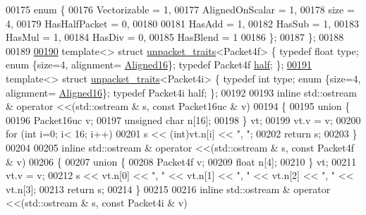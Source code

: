 \begin{DoxyCode}
{00175   \textcolor{keyword}{enum} \{
00176     Vectorizable = 1,
00177     AlignedOnScalar = 1,
00178     size = 4,
00179     HasHalfPacket = 0,
00180 
00181     HasAdd  = 1,
00182     HasSub  = 1,
00183     HasMul  = 1,
00184     HasDiv  = 0,
00185     HasBlend = 1
00186   \};
00187 \};
00188 
00189 
\hyperlink{struct_eigen_1_1internal_1_1unpacket__traits_3_01_packet4f_01_4}{00190} \textcolor{keyword}{template}<> \textcolor{keyword}{struct }\hyperlink{struct_eigen_1_1internal_1_1unpacket__traits}{unpacket\_traits}<Packet4f> \{ \textcolor{keyword}{typedef} \textcolor{keywordtype}{float}  type; \textcolor{keyword}{enum} \{size=4, alignment=
      \hyperlink{group__enums_gga45fe06e29902b7a2773de05ba27b47a1af8e2bf74b04c02199f62c5e3c06dbfcc}{Aligned16}\}; \textcolor{keyword}{typedef} Packet4f \hyperlink{struct_eigen_1_1internal_1_1_packet4f}{half}; \};
\hyperlink{struct_eigen_1_1internal_1_1unpacket__traits_3_01_packet4i_01_4}{00191} \textcolor{keyword}{template}<> \textcolor{keyword}{struct }\hyperlink{struct_eigen_1_1internal_1_1unpacket__traits}{unpacket\_traits}<Packet4i> \{ \textcolor{keyword}{typedef} \textcolor{keywordtype}{int}    type; \textcolor{keyword}{enum} \{size=4, alignment=
      \hyperlink{group__enums_gga45fe06e29902b7a2773de05ba27b47a1af8e2bf74b04c02199f62c5e3c06dbfcc}{Aligned16}\}; \textcolor{keyword}{typedef} Packet4i half; \};
00192 
00193 \textcolor{keyword}{inline} std::ostream & operator <<(std::ostream & s, \textcolor{keyword}{const} Packet16uc & v)
00194 \{
00195   \textcolor{keyword}{union }\{
00196     Packet16uc   v;
00197     \textcolor{keywordtype}{unsigned} \textcolor{keywordtype}{char} n[16];
00198   \} vt;
00199   vt.v = v;
00200   \textcolor{keywordflow}{for} (\textcolor{keywordtype}{int} i=0; i< 16; i++)
00201     s << (\textcolor{keywordtype}{int})vt.n[i] << \textcolor{stringliteral}{", "};
00202   \textcolor{keywordflow}{return} s;
00203 \}
00204 
00205 \textcolor{keyword}{inline} std::ostream & operator <<(std::ostream & s, \textcolor{keyword}{const} Packet4f & v)
00206 \{
00207   \textcolor{keyword}{union }\{
00208     Packet4f   v;
00209     \textcolor{keywordtype}{float} n[4];
00210   \} vt;
00211   vt.v = v;
00212   s << vt.n[0] << \textcolor{stringliteral}{", "} << vt.n[1] << \textcolor{stringliteral}{", "} << vt.n[2] << \textcolor{stringliteral}{", "} << vt.n[3];
00213   \textcolor{keywordflow}{return} s;
00214 \}
00215 
00216 \textcolor{keyword}{inline} std::ostream & operator <<(std::ostream & s, \textcolor{keyword}{const} Packet4i & v)
}
\end{DoxyCode}
